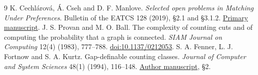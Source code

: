 \documentclass[10pt]{article}
\begin{document}
\begin{thebibliography}{9}
K. Cechl\'arov\'a, \'{A}. Cseh and D. F. Manlove.
\emph{Selected open problems in Matching Under Preferences}.
Bulletin of the EATCS 128 (2019), \S2.1 and \S3.1.2.
\href{https://hpi.de/friedrich/docs/publications/2019/BEATCS.pdf}{Primary manuscript}.
J. S. Provan and M. O. Ball.
The complexity of counting cuts and of computing the probability
that a graph is connected.
\emph{SIAM Journal on Computing} 12(4) (1983), 777--788.
\href{https://doi.org/10.1137/0212053}{doi:10.1137/0212053}.
S. A. Fenner, L. J. Fortnow and S. A. Kurtz.
Gap-definable counting classes.
\emph{Journal of Computer and System Sciences} 48(1) (1994), 116--148.
\href{https://cse.sc.edu/~fenner/papers/gaps.pdf}{Author manuscript}, \S2.
\end{thebibliography}
\end{document}
